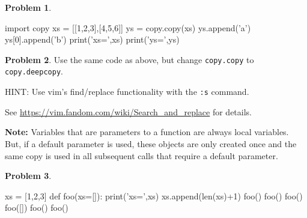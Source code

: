 \documentclass[12pt]{article}
\theoremstyle{definition}
\newtheorem{problem}{Problem}
\begin{document}
\newpage
\begin{problem}
~~~
\begin{python}
import copy
xs = [[1,2,3],[4,5,6]]
ys = copy.copy(xs)
ys.append('a')
ys[0].append('b')
print('xs=',xs)
print('ys=',ys)
\end{python}
\end{problem}
\vspace{2in}

\begin{problem}
Use the same code as above, but change \texttt{copy.copy} to \texttt{copy.deepcopy}.

\vspace{0.15in}
\noindent
HINT: Use vim's find/replace functionality with the \texttt{:s} command.

\noindent
See \url{https://vim.fandom.com/wiki/Search_and_replace} for details.
\end{problem}
\vspace{2in}
%

\newpage
\noindent
\textbf{Note:}
Variables that are parameters to a function are always local variables.
But, if a default parameter is used, these objects are only created once and the same copy is used in all subsequent calls that require a default parameter.

\begin{problem}
~~~
\begin{python}
xs = [1,2,3]
def foo(xs=[]):
    print('xs=',xs)
    xs.append(len(xs)+1)
foo()
foo()
foo()
foo([])
foo()
foo()
\end{python}
\end{problem}
\vspace{1.5in}
\end{document}

